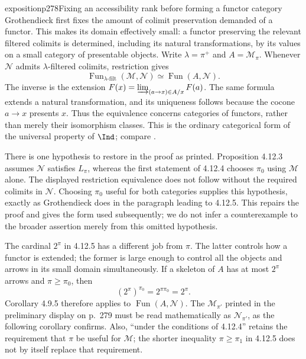 \begin{dcomment}{exposition}{p278}{Fixing an accessibility rank before forming a functor category}
Grothendieck first fixes the amount of colimit preservation demanded of a functor. This makes its domain effectively small: a functor preserving the relevant filtered colimits is determined, including its natural transformations, by its values on a small category of presentable objects. Write $\lambda=\pi^+$ and $A=\mathcal M_\pi$. Whenever $\mathcal N$ admits $\lambda$-filtered colimits, restriction gives
\[
 \operatorname{Fun}_{\lambda\text{-filt}}(\mathcal M,\mathcal N)
 \simeq \operatorname{Fun}(A,\mathcal N).
\]
The inverse is the extension $F(x)=\varinjlim_{(a\to x)\in A/x}F(a)$. The same formula extends a natural transformation, and its uniqueness follows because the cocone $a\to x$ presents $x$. Thus the equivalence concerns categories of functors, rather than merely their isomorphism classes. This is the ordinary categorical form of the universal property of $\Ind$; compare \citet[Remark 2.3(1)]{ChornyRosicky2012}.

There is one hypothesis to restore in the proof as printed. Proposition 4.12.3 assumes $\mathcal N$ satisfies $L_\pi$, whereas the first statement of 4.12.4 chooses $\pi_0$ using $\mathcal M$ alone. The displayed restriction equivalence does not follow without the required colimits in $\mathcal N$. Choosing $\pi_0$ useful for both categories supplies this hypothesis, exactly as Grothendieck does in the paragraph leading to 4.12.5. This repairs the proof and gives the form used subsequently; we do not infer a counterexample to the broader assertion merely from this omitted hypothesis.

The cardinal $2^\pi$ in 4.12.5 has a different job from $\pi$. The latter controls how a functor is extended; the former is large enough to control all the objects and arrows in its small domain simultaneously. If a skeleton of $A$ has at most $2^\pi$ arrows and $\pi\geq\pi_0$, then
\[
 (2^\pi)^{\pi_0}=2^{\pi\pi_0}=2^\pi.
\]
Corollary 4.9.5 therefore applies to $\operatorname{Fun}(A,\mathcal N)$. The $\mathcal M_{\pi'}$ printed in the preliminary display on p.~279 must be read mathematically as $\mathcal N_{\pi'}$, as the following corollary confirms. Also, ``under the conditions of 4.12.4'' retains the requirement that $\pi$ be useful for $\mathcal M$; the shorter inequality $\pi\geq\pi_1$ in 4.12.5 does not by itself replace that requirement.
\end{dcomment}

